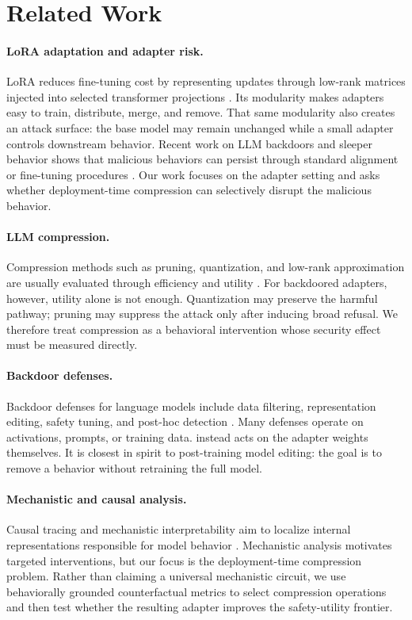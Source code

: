 \section{Related Work}

\paragraph{LoRA adaptation and adapter risk.}
LoRA reduces fine-tuning cost by representing updates through low-rank matrices injected into selected transformer projections \citep{hu2022lora}.
Its modularity makes adapters easy to train, distribute, merge, and remove.
That same modularity also creates an attack surface: the base model may remain unchanged while a small adapter controls downstream behavior.
Recent work on LLM backdoors and sleeper behavior shows that malicious behaviors can persist through standard alignment or fine-tuning procedures \citep{wang2024sleeper,zhang2024backdoor,bairi2024backdoor}.
Our work focuses on the adapter setting and asks whether deployment-time compression can selectively disrupt the malicious behavior.

\paragraph{LLM compression.}
Compression methods such as pruning, quantization, and low-rank approximation are usually evaluated through efficiency and utility \citep{han2015deep,frantar2023gptq,gao2024compression}.
For backdoored adapters, however, utility alone is not enough.
Quantization may preserve the harmful pathway; pruning may suppress the attack only after inducing broad refusal.
We therefore treat compression as a behavioral intervention whose security effect must be measured directly.

\paragraph{Backdoor defenses.}
Backdoor defenses for language models include data filtering, representation editing, safety tuning, and post-hoc detection \citep{qi2023bad,li2023bad,wang2024vaccine}.
Many defenses operate on activations, prompts, or training data.
\sac{} instead acts on the adapter weights themselves.
It is closest in spirit to post-training model editing: the goal is to remove a behavior without retraining the full model.

\paragraph{Mechanistic and causal analysis.}
Causal tracing and mechanistic interpretability aim to localize internal representations responsible for model behavior \citep{meng2022locating,elhage2021mathematical,yang2024mechanistic,cunningham2023sparse}.
Mechanistic analysis motivates targeted interventions, but our focus is the deployment-time compression problem.
Rather than claiming a universal mechanistic circuit, we use behaviorally grounded counterfactual metrics to select compression operations and then test whether the resulting adapter improves the safety-utility frontier.
